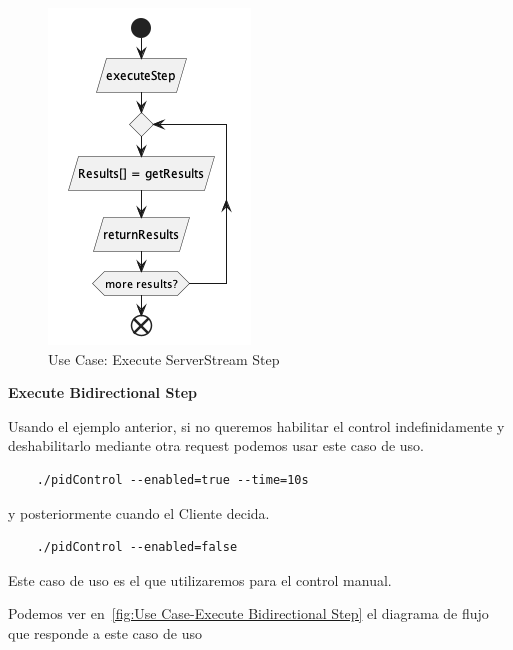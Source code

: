 \begin{figure}[H]
    \centering
    \includegraphics[height=0.2\textheight]{./part/Proyecto_ejecutivo/memoria_descriptiva/descripcionDelProyecto/client/uml/executeServerStreamStep}
    \caption{Use Case: Execute ServerStream Step}\label{fig:Use Case-Execute ServerStream Step}
\end{figure}

\textbf{Execute Bidirectional Step}

Usando el ejemplo anterior, si no queremos habilitar el control indefinidamente y deshabilitarlo mediante otra request podemos usar este caso de uso.

\begin{verbatim}
    ./pidControl --enabled=true --time=10s
\end{verbatim}

y posteriormente cuando el Cliente decida.

\begin{verbatim}
    ./pidControl --enabled=false
\end{verbatim}

Este caso de uso es el que utilizaremos para el control manual.

Podemos ver en~\cref{fig:Use Case-Execute Bidirectional Step} el diagrama de flujo que responde a este caso de uso

